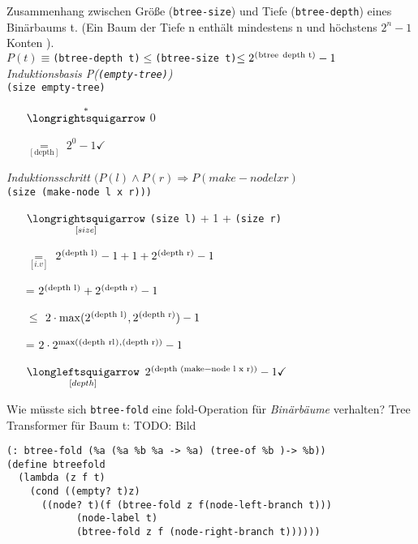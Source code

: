 Zusammenhang zwischen Grö\ss e (\lstinline|btree-size|) und Tiefe (\lstinline|btree-depth|) eines Binärbaums t. (\glqq Ein Baum der Tiefe n enthält mindestens n und höchstens $2^n-1$ Konten \grqq).\\
$P(t) \equiv $\lstinline|(btree-depth t)|$\le$\lstinline|(btree-size t)|$\le 2^{\text{\lstinline|(btree depth t)|}}-1$\\
\emph{Induktionsbasis P(\lstinline|(empty-tree)|)}\\
\lstinline|(size empty-tree)|
\begin{enumerate}
\item[$\overset{*}{\text{\eval}}$]0
\item[$\underset{[\text{depth}]}{=}$] $2^0 -1 \checkmark$
\end{enumerate}
\emph{Induktionsschritt $(P(l) \land P(r) \Rightarrow P(make-node l x r)$}\\
\lstinline|(size (make-node l x r)))|
\begin{enumerate}
\item[$\underset{[size]}{\text{\eval}}$] \lstinline|(size l)| + 1 + \lstinline|(size r)|
\item[$\underset{[i.v]}{=}$] $2^{\text{\lstinline|(depth l)|}} - 1 + 1 + 2^{\text{\lstinline|(depth r)|}} - 1$
\item[=] $2^{\text{\lstinline|(depth l)|}} + 2^{\text{\lstinline|(depth r)|}} - 1$
\item[$\le$] $2 \cdot \max(2^{\text{\lstinline|(depth l)|}},2^{\text{\lstinline|(depth r)|}})-1$
\item[=] $2 \cdot 2^{\max(\text{\lstinline|(depth rl)|},\text{\lstinline|(depth r)|})}-1$
\item[$\underset{[depth]}{\text{\reval}}$] $2^{\text{\lstinline|(depth (make-node l x r))|}}-1 \checkmark$
\end{enumerate}
Wie müsste sich \lstinline|btree-fold| eine fold-Operation für \emph{Binärbäume} verhalten? Tree Transformer für Baum t:
TODO: Bild\\
\begin{lstlisting}
(: btree-fold (%a (%a %b %a -> %a) (tree-of %b )-> %b))
(define btreefold
  (lambda (z f t)
    (cond ((empty? t)z)
	  ((node? t)(f (btree-fold z f(node-left-branch t)))
		    (node-label t)
		    (btree-fold z f (node-right-branch t))))))
\end{lstlisting}
